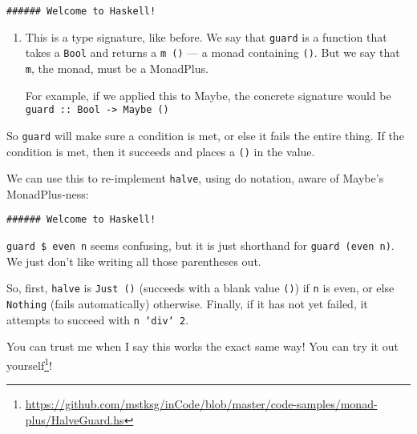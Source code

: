 \documentclass[]{article}
\newenvironment{Shaded}{}{}
\newcommand{\KeywordTok}[1]{\textcolor[rgb]{0.00,0.44,0.13}{\textbf{{#1}}}}
\newcommand{\DataTypeTok}[1]{\textcolor[rgb]{0.56,0.13,0.00}{{#1}}}
\newcommand{\DecValTok}[1]{\textcolor[rgb]{0.25,0.63,0.44}{{#1}}}
\newcommand{\CommentTok}[1]{\textcolor[rgb]{0.38,0.63,0.69}{\textit{{#1}}}}
\newcommand{\OtherTok}[1]{\textcolor[rgb]{0.00,0.44,0.13}{{#1}}}
\newcommand{\FunctionTok}[1]{\textcolor[rgb]{0.02,0.16,0.49}{{#1}}}
\newcommand{\NormalTok}[1]{{#1}}
\renewcommand{\href}[2]{#2\footnote{\url{#1}}}
\begin{document}
\begin{verbatim}
###### Welcome to Haskell!
\end{verbatim}

\begin{enumerate}
\def\labelenumi{\arabic{enumi}.}
\item
  This is a type signature, like before. We say that \texttt{guard} is a
  function that takes a \texttt{Bool} and returns a \texttt{m\ ()} --- a
  monad containing \texttt{()}. But we say that \texttt{m}, the monad,
  must be a MonadPlus.

  For example, if we applied this to Maybe, the concrete signature would
  be \texttt{guard\ ::\ Bool\ -\textgreater{}\ Maybe\ ()}
\end{enumerate}

So \texttt{guard} will make sure a condition is met, or else it fails
the entire thing. If the condition is met, then it succeeds and places a
\texttt{()} in the value.

We can use this to re-implement \texttt{halve}, using do notation, aware
of Maybe's MonadPlus-ness:

\begin{Shaded}
\end{Shaded}

\begin{verbatim}
###### Welcome to Haskell!
\end{verbatim}

\texttt{guard\ \$\ even\ n} seems confusing, but it is just shorthand
for \texttt{guard\ (even\ n)}. We just don't like writing all those
parentheses out.

So, first, \texttt{halve} is \texttt{Just\ ()} (succeeds with a blank
value \texttt{()}) if \texttt{n} is even, or else \texttt{Nothing}
(fails automatically) otherwise. Finally, if it has not yet failed, it
attempts to succeed with \texttt{n\ `div`\ 2}.

You can trust me when I say this works the exact same way! You can
\href{https://github.com/mstksg/inCode/blob/master/code-samples/monad-plus/HalveGuard.hs}{try
it out yourself}!
\end{document}
